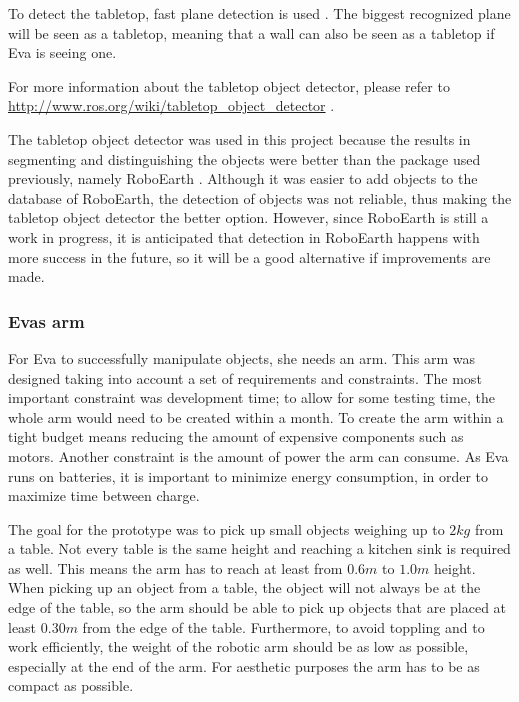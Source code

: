 \documentclass[project_eva.tex]{subfiles}
\begin{document}
To detect the tabletop, fast plane detection is used \cite{plane}. The biggest recognized plane will be seen as a tabletop, meaning that a wall can also be seen as a 
tabletop if Eva is seeing one.

For more information about the tabletop object detector, please refer to \url{http://www.ros.org/wiki/tabletop\_object\_detector} \cite{tabletop}.

The tabletop object detector was used in this project because the results in segmenting and distinguishing the objects were 
better than the package used previously, namely RoboEarth \cite{Roboearth}. Although it was easier to add objects to the 
database of RoboEarth, the detection of objects was not reliable, thus making the tabletop object detector the better 
option. However, since RoboEarth is still a work in progress, it is anticipated that detection in RoboEarth happens with 
more success in the future, so it will be a good alternative if improvements are made.

\subsubsection*{Eva\textquotesingle s arm}
For Eva to successfully manipulate objects, she needs an arm. This arm was designed taking into account a set of requirements and constraints. The most important constraint was development time; to allow for some testing time, the whole arm would need to be created within a month. To create the arm within a tight budget means reducing the amount of expensive components such as motors. Another constraint is the amount of power the arm can consume. As Eva runs on batteries, it is important to minimize energy consumption, in order to maximize time between charge.

The goal for the prototype was to pick up small objects weighing up to $2kg$ from a table. Not every table is the same height and reaching a kitchen sink is required as well. This means the arm has to reach at least from $0.6m$ to $1.0m$ height. %
When picking up an object from a table, the object will not always be at the edge of the table, so the arm should be able to pick up objects that are placed at least $0.30m$ from the edge of the table. %
Furthermore, to avoid toppling and to work efficiently, the weight of the robotic arm should be as low as possible, especially at the end of the arm. For aesthetic purposes the arm has to be as compact as possible.
\end{document}
